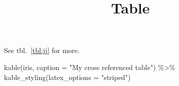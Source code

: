 \documentclass[
]{article}
\title{Table}
\author{}
\date{}
\newenvironment{Shaded}{}{}
\newcommand{\AttributeTok}[1]{\textcolor[rgb]{0.49,0.56,0.16}{#1}}
\newcommand{\FunctionTok}[1]{\textcolor[rgb]{0.02,0.16,0.49}{#1}}
\newcommand{\NormalTok}[1]{#1}
\newcommand{\SpecialCharTok}[1]{\textcolor[rgb]{0.25,0.44,0.63}{#1}}
\newcommand{\StringTok}[1]{\textcolor[rgb]{0.25,0.44,0.63}{#1}}
\begin{document}
\maketitle

See tbl.~\ref{tbl:jj} for more.

\begin{Shaded}
\begin{Highlighting}[]
\FunctionTok{kable}\NormalTok{(iris, }\AttributeTok{caption =} \StringTok{"My cross referenced table"}\NormalTok{) }\SpecialCharTok{\%\textgreater{}\%}
  \FunctionTok{kable\_styling}\NormalTok{(}\AttributeTok{latex\_options =} \StringTok{"striped"}\NormalTok{)}
\end{Highlighting}
\end{Shaded}

\hypertarget{tbl:jj}{}
\begin{table}


\end{table}
\end{document}
